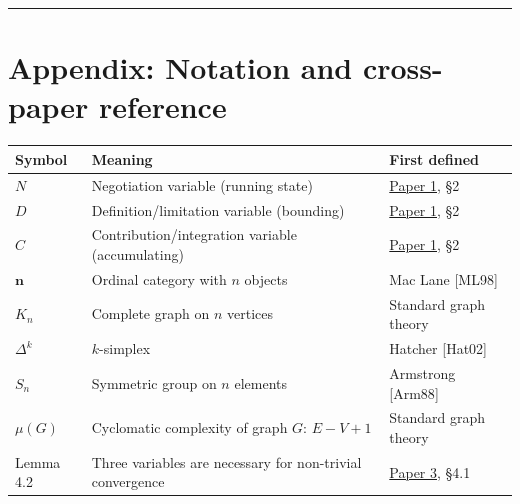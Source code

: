 \documentclass[12pt]{article}
\begin{document}
\begin{center}\rule{0.5\linewidth}{0.5pt}\end{center}

\section{Appendix: Notation and cross-paper
reference}\label{appendix-notation-and-cross-paper-reference}

\begin{longtable}[]{@{}
  >{\raggedright\arraybackslash}p{}
  >{\raggedright\arraybackslash}p{}
  >{\raggedright\arraybackslash}p{}@{}}
\toprule\noalign{}
\begin{minipage}[b]{\linewidth}\raggedright
Symbol
\end{minipage} & \begin{minipage}[b]{\linewidth}\raggedright
Meaning
\end{minipage} & \begin{minipage}[b]{\linewidth}\raggedright
First defined
\end{minipage} \\
\midrule\noalign{}
\endhead
\bottomrule\noalign{}
\endlastfoot
\(N\) & Negotiation variable (running state) &
\href{https://github.com/baardev/truevalue/blob/main/docnav/Research/papers/1_recursive-tholonic-five-constants/1_recursive-tholonic-five-constants.pdf}{Paper
1}, §2 \\
\(D\) & Definition/limitation variable (bounding) &
\href{https://github.com/baardev/truevalue/blob/main/docnav/Research/papers/1_recursive-tholonic-five-constants/1_recursive-tholonic-five-constants.pdf}{Paper
1}, §2 \\
\(C\) & Contribution/integration variable (accumulating) &
\href{https://github.com/baardev/truevalue/blob/main/docnav/Research/papers/1_recursive-tholonic-five-constants/1_recursive-tholonic-five-constants.pdf}{Paper
1}, §2 \\
\(\mathbf{n}\) & Ordinal category with \(n\) objects & Mac Lane
{[}ML98{]} \\
\(K_n\) & Complete graph on \(n\) vertices & Standard graph theory \\
\(\Delta^k\) & \(k\)-simplex & Hatcher {[}Hat02{]} \\
\(S_n\) & Symmetric group on \(n\) elements & Armstrong {[}Arm88{]} \\
\(\mu(G)\) & Cyclomatic complexity of graph \(G\): \(E - V + 1\) &
Standard graph theory \\
Lemma 4.2 & Three variables are necessary for non-trivial convergence &
\href{https://github.com/baardev/truevalue/blob/main/docnav/Research/papers/3_minimal-recursive-triadic-framework/3_minimal-recursive-triadic-framework.pdf}{Paper
3}, §4.1 \\
\end{longtable}
\end{document}
